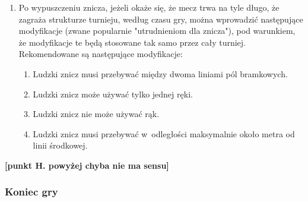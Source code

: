 \documentclass[12pt]{article}
\begin{document}
\begin{enumerate}
	\item Po wypuszczeniu znicza, jeżeli okaże się, że mecz trwa na tyle długo, że
	      zagraża strukturze turnieju, według czasu gry, można wprowadzić
	      następujące modyfikacje (zwane popularnie "utrudnieniom dla znicza"),
	      pod warunkiem, że modyfikacje te będą stosowane tak samo przez cały
	      turniej. Rekomendowane są następujące modyfikacje:
	      \begin{enumerate}
		      \item Ludzki znicz musi przebywać między dwoma liniami pól bramkowych.

		      \item Ludzki znicz może używać tylko jednej ręki.

		      \item Ludzki znicz nie może używać rąk.

		      \item Ludzki znicz musi przebywać w~odległości maksymalnie około metra od
		            linii środkowej.
	      \end{enumerate}
\end{enumerate}

\textbf{[punkt H. powyżej chyba nie ma sensu]}

\subsubsection{Koniec gry}
\end{document}
